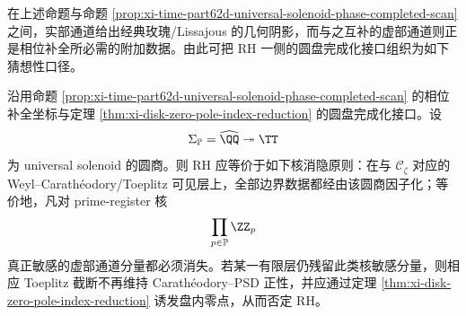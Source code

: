 在上述命题与命题 \ref{prop:xi-time-part62d-universal-solenoid-phase-completed-scan} 之间，实部通道给出经典玫瑰/Lissajous 的几何阴影，而与之互补的虚部通道则正是相位补全所必需的附加数据。由此可把 RH 一侧的圆盘完成化接口组织为如下猜想性口径。

\begin{conjecture}\label{conj:xi-time-part62d-imaginary-channel-prime-kernel-rh}
沿用命题 \ref{prop:xi-time-part62d-universal-solenoid-phase-completed-scan} 的相位补全坐标与定理 \ref{thm:xi-disk-zero-pole-index-reduction} 的圆盘完成化接口。设
\[
\Sigma_{\mathbb P}=\widehat{\QQ}
\twoheadrightarrow
\TT
\]
为 universal solenoid 的圆商。则 RH 应等价于如下核消隐原则：在与 \(\mathscr C_\zeta\) 对应的 Weyl--Carath\'eodory/Toeplitz 可见层上，全部边界数据都经由该圆商因子化；等价地，凡对 prime-register 核
\[
\prod_{p\in\mathbb P}\ZZ_p
\]
真正敏感的虚部通道分量都必须消失。若某一有限层仍残留此类核敏感分量，则相应 Toeplitz 截断不再维持 Carath\'eodory--PSD 正性，并应通过定理 \ref{thm:xi-disk-zero-pole-index-reduction} 诱发盘内零点，从而否定 RH。
\end{conjecture}

\endinput
